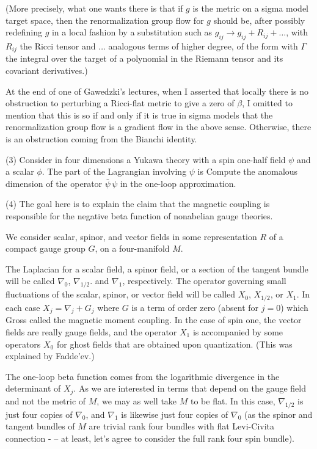 (More precisely, what
one wants there is that if $g$ is the metric on a sigma model target space,
then the renormalization group flow for $g$ should be, after possibly
redefining $g $ in a local fashion by a substitution such as $g_{ij}\to g_{ij}
+R_{ij}+\dots$, with $R_{ij}$ the Ricci tensor and $\dots$ analogous
terms of higher degree, of the form
\eqn{}
with $\Gamma$ the integral over the target of a polynomial in the Riemann
tensor and its covariant derivatives.)

At the end of one of Gawedzki's lectures, when I asserted that locally
there is no obstruction to perturbing a Ricci-flat metric to give a zero
of $\beta$, I omitted to mention that this is so if and only if 
it is true in sigma models that the renormalization group flow is a gradient
flow in the above sense. Otherwise, there is an obstruction coming from
the Bianchi identity.


(3) Consider in 
four dimensions a Yukawa theory with a spin one-half field 
$\psi$
and a scalar $\phi$.  The part of the Lagrangian involving $\psi$ is
\eqn{}
Compute the anomalous dimension of the operator $\bar\psi \,\psi$ in
the one-loop approximation.

(4) The goal here is to explain the claim that the magnetic coupling
is responsible for the negative beta function of nonabelian gauge theories.

We consider scalar, spinor, and vector fields in some representation $R$
of a compact gauge group $G$, on a four-manifold $M$.

The Laplacian for a scalar field, a spinor field, or a section of the
tangent bundle will be called $\nabla_0$, $\nabla_{1/2}$. and $\nabla_1$,
respectively.  The operator governing small fluctuations of the scalar,
spinor, or vector field will be called $X_0$, $X_{1/2}$, or $X_1$.
In each case $X_j=\nabla_j + G_j$ where $G$ is a   term of order zero
(absent for $j=0$) which Gross called the magnetic moment coupling.
In the case of spin one, the vector fields are really gauge fields,
and the operator $X_1$ is accompanied by some operators $X_0$ for
ghost fields that are obtained upon quantization. (This was explained by
Fadde'ev.) 

The one-loop beta function comes from the logarithmic divergence in the 
determinant
of $X_j$.  As we are interested in terms that depend on the gauge field
and not the metric of $M$, we may as well take $M$ to be flat.
In this case, $\nabla_{1/2}$ is just four copies of $\nabla_0$, and $\nabla_1$
is likewise just four copies of $\nabla_0$ (as the spinor and tangent bundles
of $M$ are trivial rank four bundles with flat Levi-Civita connection 
- -- at least, let's agree to consider the full rank four spin bundle).

